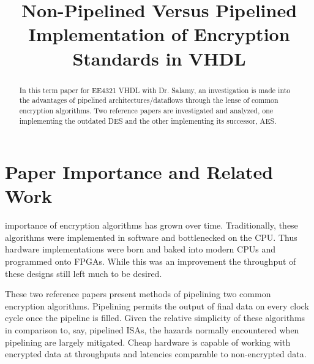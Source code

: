 \documentclass[journal,twocolumn]{IEEEtran}
\begin{document}
\title{Non-Pipelined Versus Pipelined Implementation of Encryption Standards in
VHDL} 
\author{
}

%
{}

\maketitle

\begin{abstract}
In this term paper for EE4321 VHDL with Dr. Salamy, an investigation is made 
into the advantages of pipelined architectures/dataflows through the lense of
common encryption algorithms. Two reference papers are investigated and 
analyzed, one implementing the outdated DES and the other implementing its
successor, AES.  
\end{abstract}

\section{Paper Importance and Related Work}
 importance of encryption algorithms has grown over 
time. Traditionally, these algorithms were implemented in software and 
bottlenecked on the CPU. Thus hardware implementations were born and baked 
into modern CPUs and programmed onto FPGAs. While this was an improvement 
the throughput of these designs still left much to be desired.

These two reference papers present methods of pipelining two common encryption
algorithms. Pipelining permits the output of final data on every clock cycle
once the pipeline is filled. Given the relative simplicity of these algorithms
in comparison to, say, pipelined ISAs, the hazards normally encountered when
pipelining are largely mitigated. Cheap hardware is capable of working with
encrypted data at throughputs and latencies comparable to non-encrypted data.
\end{document}
